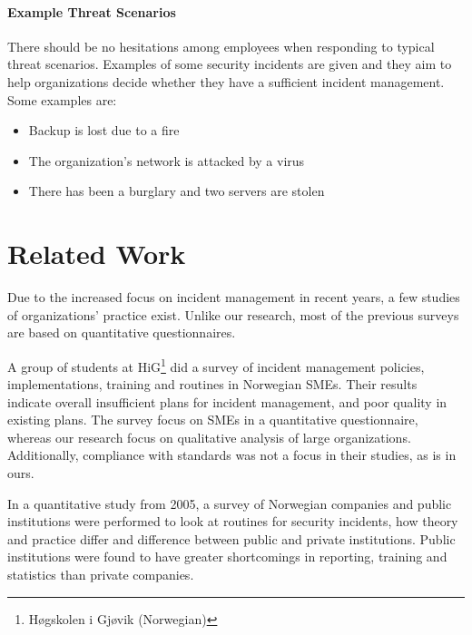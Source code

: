 \paragraph{Example Threat Scenarios}
There should be no hesitations among employees when responding to typical threat scenarios. Examples of some security incidents are given and they aim to help organizations decide whether they have a sufficient incident management. Some examples are:
\begin{itemize}
\item Backup is lost due to a fire
\item The organization's network is attacked by a virus
\item There has been a burglary and two servers are stolen 
\end{itemize}



\section{Related Work}
Due to the increased focus on incident management in recent years, a few studies of organizations' practice exist. Unlike our research, most of the previous surveys are based on quantitative questionnaires.

A group of students at HiG\footnote{H\o gskolen i Gj\o vik (Norwegian)} did a survey of incident management policies, implementations, training and routines in Norwegian \acp{SME}. Their results indicate overall insufficient plans for incident management, and poor quality in existing plans. The survey focus on \acp{SME}  in a quantitative questionnaire, whereas our research focus on qualitative analysis of large organizations. Additionally, compliance with standards was not a focus in their studies, as is in ours.

In a quantitative study from 2005\cite{brage}, a survey of Norwegian companies and public institutions were performed to look at routines for security incidents, how theory and practice differ and difference between public and private institutions. Public institutions were found to have greater shortcomings in reporting, training and statistics than private companies. 